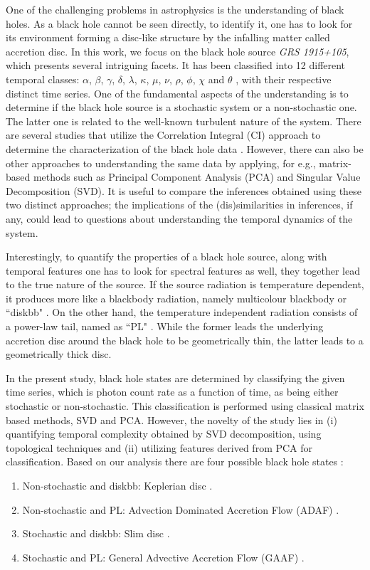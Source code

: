 \documentclass[journal]{IEEEtran}
\begin{document}
One of the challenging problems in astrophysics is the understanding of black holes. As a black hole cannot be seen directly, to identify it, one has to look for its environment forming a disc-like structure by the infalling matter called accretion disc. In this work, we focus on the black hole source \textit{GRS 1915+105}, which presents several intriguing facets. It has been classified into 12 different temporal classes: $\alpha$, $\beta$, $\gamma$, $\delta$, $\lambda$, $\kappa$, $\mu$, $\nu$, $\rho$, $\phi$, $\chi$ and $\theta$ \cite{Belloni2000}, with their respective distinct time series. One of the fundamental aspects of the understanding is to determine if the black hole source is a stochastic system or a non-stochastic one. The latter one is related to the well-known turbulent nature of the system. There are several studies that utilize the Correlation Integral (CI) approach to determine the characterization of the black hole data \cite{Mukhopadhyay2004, misra2006}. However, there can also be other approaches to understanding the same data by applying, for e.g.,  matrix-based methods such as Principal Component Analysis (PCA) and Singular Value Decomposition (SVD). It is useful to compare the inferences obtained using these two distinct approaches; the implications of the (dis)similarities in inferences, if any, could lead to questions about understanding the temporal dynamics of the system.

Interestingly, to quantify the properties of a black hole source, along with temporal features one has to look for spectral features as well, they together lead to the true nature of the source. If the source radiation is temperature dependent, it produces more like a blackbody radiation, namely multicolour blackbody or ``diskbb" \cite{Shakura1973}. On the other hand, the temperature independent radiation consists of a power-law tail, named as ``PL" \cite{chakrabarti1995,narayan1994}. While the former leads the underlying accretion disc around the black hole to be geometrically thin, the latter leads to a geometrically thick disc.

In the present study, black hole states are determined by  classifying the given time series, which is photon count rate as a function of time,  as being either stochastic or non-stochastic. This classification is performed using classical matrix based methods, SVD and PCA.
However, the novelty of the study lies in (i) quantifying temporal complexity obtained by SVD decomposition, using topological techniques and (ii) utilizing features derived from PCA for classification. Based on our analysis there are four possible black hole states \cite{Adegoke2018}:
\begin{enumerate}
\item Non-stochastic and diskbb: Keplerian disc \cite{Shakura1973}.
\item Non-stochastic and PL: Advection Dominated Accretion Flow (ADAF)  \cite{narayan1994}.
\item Stochastic and diskbb: Slim disc \cite{Abramowicz1988}.
\item Stochastic and PL: General Advective Accretion Flow (GAAF) \cite{chakrabarti1995, rajesh2010}.
\end{enumerate}
\end{document}
